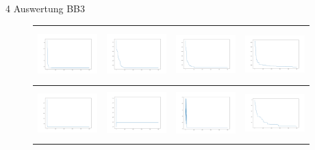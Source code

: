 \documentclass{ocbeameruni}
\begin{document}
\begin{frame}{4 Auswertung BB3}
    \begin{center}
    \begin{figure}
    \begin{tabular}{|c|c|c|c|} 
      \hline
      \includegraphics[width=23mm, height=20mm]{plots/bb3_naive.png} 
    & \includegraphics[width=23mm, height=20mm]{plots/bb3_ga_simple.png} 
    & \includegraphics[width=23mm, height=20mm]{plots/bb3_ga_gray.png}
    & \includegraphics[width=23mm, height=20mm]{plots/bb3_ga_float.png} \\ \hline
      \includegraphics[width=23mm, height=20mm]{plots/bb3_hc.png} 
    & \includegraphics[width=23mm, height=20mm]{plots/bb3_hc_sa.png} 
    & \includegraphics[width=23mm, height=20mm]{plots/bb3_hc_rs.png}
    & \includegraphics[width=23mm, height=20mm]{plots/bb3_sa.png} \\ \hline

\end{tabular}
\end{figure}
\end{center}
\end{frame}
\end{document}
